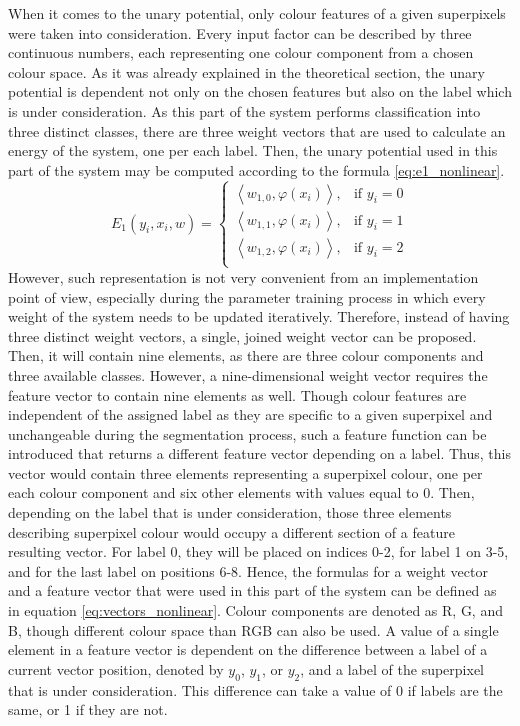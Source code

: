 When it comes to the unary potential, only colour features of a given superpixels were taken into consideration. Every input factor can be described by three continuous numbers, each representing one colour component from a chosen colour space. As it was already explained in the theoretical section, the unary potential is dependent not only on the chosen features but also on the label which is under consideration. As this part of the system performs classification into three distinct classes, there are three weight vectors that are used to calculate an energy of the system, one per each label. Then, the unary potential used in this part of the system may be computed according to the formula \ref{eq:e1_nonlinear}. 
\begin{equation}
    \label{eq:e1_nonlinear}
    E_1(y_i,x_i,w)= 
    \begin{cases}
        \left \langle w_{1,0}, \varphi({x_i}) \right \rangle , &  \text{if } y_i = 0\\ 
        \left \langle w_{1,1}, \varphi({x_i}) \right \rangle , & \text{if } y_i = 1\\
        \left \langle w_{1,2}, \varphi({x_i}) \right \rangle , & \text{if } y_i = 2\\  
    \end{cases}
\end{equation}
However, such representation is not very convenient from an implementation point of view, especially during the parameter training process in which every weight of the system needs to be updated iteratively. Therefore, instead of having three distinct weight vectors, a single, joined weight vector can be proposed. Then, it will contain nine elements, as there are three colour components and three available classes. However, a nine-dimensional weight vector requires the feature vector to contain nine elements as well. Though colour features are independent of the assigned label as they are specific to a given superpixel and unchangeable during the segmentation process, such a feature function can be introduced that returns a different feature vector depending on a label. Thus, this vector would contain three elements representing a superpixel colour, one per each colour component and six other elements with values equal to 0. Then, depending on the label that is under consideration, those three elements describing superpixel colour would occupy a different section of a feature resulting vector. For label 0, they will be placed on indices 0-2, for label 1 on 3-5, and for the last label on positions 6-8. Hence, the formulas for a weight vector and a feature vector that were used in this part of the system can be defined as in equation \ref{eq:vectors_nonlinear}. Colour components are denoted as R, G, and B, though different colour space than RGB can also be used. A value of a single element in a feature vector is dependent on the difference between a label of a current vector position, denoted by $y_0$, $y_1$, or $y_2$, and a label of the superpixel that is under consideration. This difference can take a value of 0 if labels are the same, or 1 if they are not.
